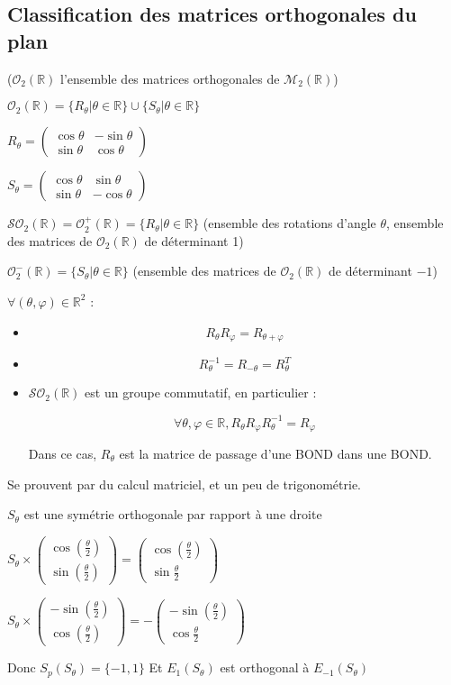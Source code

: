 \documentclass[a4paper,12pt]{book}
\newcommand{\Prop}[2]{\begin{tcolorbox}[sharp corners, colback=white,colframe=red!90!black!75, title=Proposition : #1]#2\end{tcolorbox}}
\newcommand{\Pre}[1]{\begin{tcolorbox}[sharp corners, colback=white,colframe=green!60!green!30!black!75, title=Preuve]#1\end{tcolorbox}}
\def\R{\mathbb{R}}
\begin{document}
\subsection{Classification des matrices orthogonales du plan}
($\mathcal{O}_2(\R)$ l'ensemble des matrices orthogonales de $\mathcal{M}_2(\R)$)
\par $\mathcal{O}_2(\R)=\{R_\theta\vert\theta\in\R\}\cup\{S_\theta\vert\theta\in\R\}$
\par $R_\theta = \begin{pmatrix} \cos\theta & -\sin\theta \\ \sin\theta & \cos\theta \end{pmatrix}$
\par $S_\theta = \begin{pmatrix} \cos\theta & \sin\theta \\ \sin\theta & -\cos\theta\end{pmatrix}$
\par $\mathcal{SO}_2(\R) = \mathcal{O}_2^+(\R) = \{R_\theta\vert\theta\in\R\}$ (ensemble des rotations d'angle $\theta$, ensemble des matrices de $\mathcal{O}_2(\R)$ de déterminant 1)
\par $\mathcal{O}_2^-(\R)=\{S_\theta\vert\theta\in\R\}$ (ensemble des matrices de $\mathcal{O}_2(\R)$ de déterminant $-1$)
\Prop{}{$\forall(\theta,\varphi)\in\R^2$ :\begin{itemize}
\item $$R_\theta R_\varphi = R_{\theta+\varphi}$$
\item $$R_\theta^{-1} = R_{-\theta} =R_\theta^T$$
\item $\mathcal{SO}_2(\R)$ est un groupe commutatif, en particulier :
\par $$\forall \theta,\varphi\in\R, R_\theta R_\varphi R_\theta^{-1}=R_\varphi$$
\par Dans ce cas, $R_\theta$ est la matrice de passage d'une BOND dans une BOND.
\end{itemize}}
\Pre{Se prouvent par du calcul matriciel, et un peu de trigonométrie.}
$S_\theta$ est une symétrie orthogonale par rapport à une droite
\par $S_\theta\times \begin{pmatrix}\cos(\frac{\theta}{2})\\\sin(\frac{\theta}{2})\end{pmatrix} = \begin{pmatrix}\cos(\frac{\theta}{2})\\ \sin\frac{\theta}{2}\end{pmatrix}$
\par $S_\theta\times \begin{pmatrix}-\sin(\frac{\theta}{2})\\\cos(\frac{\theta}{2})\end{pmatrix} = -\begin{pmatrix}-\sin(\frac{\theta}{2})\\ \cos\frac{\theta}{2}\end{pmatrix}$
\par Donc $S_p(S_\theta) = \{-1,1\}$ Et $E_1(S_\theta)$ est orthogonal à $E_{-1}(S_\theta)$
\end{document}
